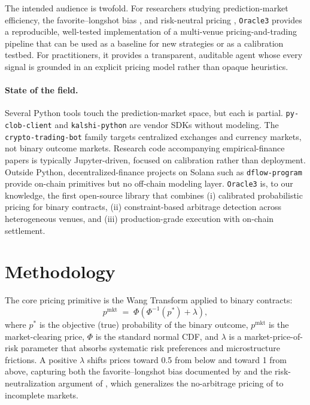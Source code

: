 \documentclass[11pt,a4paper]{article}
\begin{document}
The intended audience is twofold. For researchers studying prediction-market
efficiency, the favorite--longshot bias \citep{thaler:1988,snowberg:2010}, and
risk-neutral pricing \citep{harrison:1979,wang:2000}, \texttt{Oracle3}
provides a reproducible, well-tested implementation of a multi-venue
pricing-and-trading pipeline that can be used as a baseline for new strategies
or as a calibration testbed. For practitioners, it provides a transparent,
auditable agent whose every signal is grounded in an explicit pricing model
rather than opaque heuristics.

\paragraph{State of the field.}
Several Python tools touch the prediction-market space, but each is partial.
\texttt{py-clob-client} and \texttt{kalshi-python} are vendor SDKs without
modeling. The \texttt{crypto-trading-bot} family targets centralized exchanges
and currency markets, not binary outcome markets. Research code accompanying
empirical-finance papers is typically Jupyter-driven, focused on calibration
rather than deployment. Outside Python, decentralized-finance projects on
Solana such as \texttt{dflow-program} provide on-chain primitives but no
off-chain modeling layer. \texttt{Oracle3} is, to our knowledge, the first
open-source library that combines (i) calibrated probabilistic pricing for
binary contracts, (ii) constraint-based arbitrage detection across
heterogeneous venues, and (iii) production-grade execution with on-chain
settlement.

\section{Methodology}
\label{sec:method}

The core pricing primitive is the Wang Transform applied to binary contracts:
%
\begin{equation}
  p^{\mathrm{mkt}} \;=\; \Phi\!\left(\Phi^{-1}(p^{*}) + \lambda\right),
  \label{eq:wang}
\end{equation}
%
where $p^{*}$ is the objective (true) probability of the binary outcome,
$p^{\mathrm{mkt}}$ is the market-clearing price, $\Phi$ is the standard normal
CDF, and $\lambda$ is a market-price-of-risk parameter that absorbs systematic
risk preferences and microstructure frictions. A positive $\lambda$ shifts
prices toward 0.5 from below and toward 1 from above, capturing both the
favorite--longshot bias documented by \citet{thaler:1988,snowberg:2010} and the
risk-neutralization argument of \citet{wang:2000,wang:2002}, which generalizes
the no-arbitrage pricing of \citet{harrison:1979} to incomplete markets.
\end{document}
